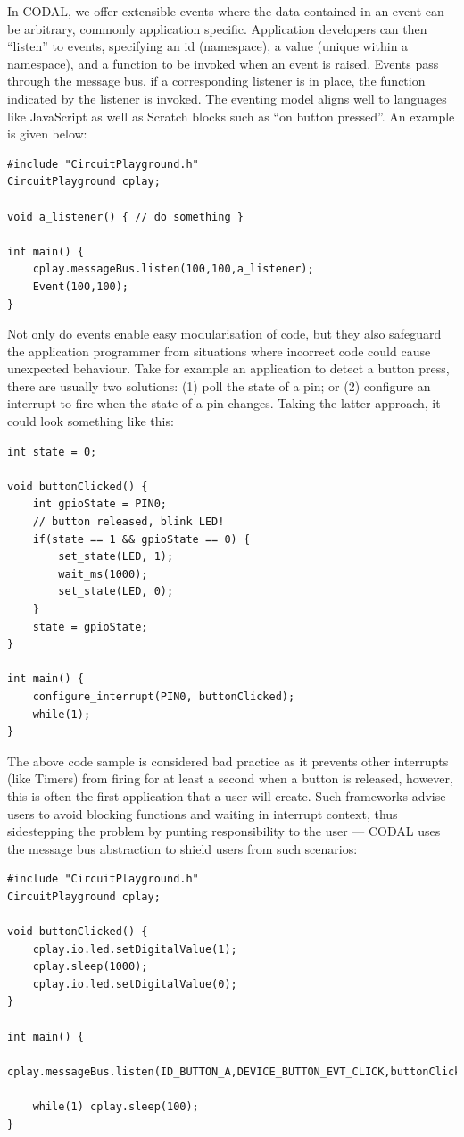 In CODAL, we offer extensible events where the data contained in an event can be arbitrary, commonly application specific. Application developers can then ``listen'' to events, specifying an id (namespace), a value (unique within a namespace), and a function to be invoked when an event is raised. Events pass through the message bus, if a corresponding listener is in place, the function indicated by the listener is invoked. The eventing model aligns well to languages like JavaScript as well as Scratch blocks such as ``on button pressed''. An example is given below:

\begin{lstlisting}
#include "CircuitPlayground.h"
CircuitPlayground cplay;

void a_listener() { // do something }

int main() {
    cplay.messageBus.listen(100,100,a_listener);
    Event(100,100);
}
\end{lstlisting}

Not only do events enable easy modularisation of code, but they also safeguard the application programmer from situations where incorrect code could cause unexpected behaviour. Take for example an application to detect a button press, there are usually two solutions: (1) poll the state of a pin; or (2) configure an interrupt to fire when the state of a pin changes. Taking the latter approach, it could look something like this:

\begin{lstlisting}
int state = 0;

void buttonClicked() {
    int gpioState = PIN0;
    // button released, blink LED!
    if(state == 1 && gpioState == 0) {
        set_state(LED, 1);
        wait_ms(1000);
        set_state(LED, 0);
    }
    state = gpioState;
}

int main() {
    configure_interrupt(PIN0, buttonClicked);
    while(1);
}
\end{lstlisting}

The above code sample is considered bad practice as it prevents other interrupts (like Timers) from firing for at least a second when a button is released, however, this is often the first application that a user will create. Such frameworks advise users to avoid blocking functions and waiting in interrupt context, thus sidestepping the problem by punting responsibility to the user --- CODAL uses the message bus abstraction to shield users from such scenarios:

\begin{lstlisting}
#include "CircuitPlayground.h"
CircuitPlayground cplay;

void buttonClicked() {
    cplay.io.led.setDigitalValue(1);
    cplay.sleep(1000);
    cplay.io.led.setDigitalValue(0);
}

int main() {
    cplay.messageBus.listen(ID_BUTTON_A,DEVICE_BUTTON_EVT_CLICK,buttonClicked);

    while(1) cplay.sleep(100);
}
\end{lstlisting}

